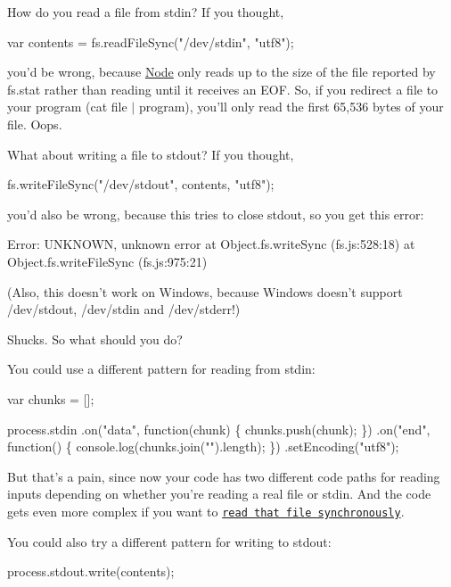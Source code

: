 How do you read a file from stdin? If you thought,


\begin{DoxyCode}
var contents = fs.readFileSync("/dev/stdin", "utf8");
\end{DoxyCode}


you’d be wrong, because \mbox{\hyperlink{classNode}{Node}} only reads up to the size of the file reported by fs.\+stat rather than reading until it receives an E\+OF. So, if you redirect a file to your program ({\ttfamily cat file $\vert$ program}), you’ll only read the first 65,536 bytes of your file. Oops.

What about writing a file to stdout? If you thought,


\begin{DoxyCode}
fs.writeFileSync("/dev/stdout", contents, "utf8");
\end{DoxyCode}


you’d also be wrong, because this tries to close stdout, so you get this error\+:


\begin{DoxyCode}
Error: UNKNOWN, unknown error
    at Object.fs.writeSync (fs.js:528:18)
    at Object.fs.writeFileSync (fs.js:975:21)
\end{DoxyCode}


(Also, this doesn’t work on Windows, because Windows doesn’t support /dev/stdout, /dev/stdin and /dev/stderr!)

Shucks. So what should you do?

You could use a different pattern for reading from stdin\+:


\begin{DoxyCode}
var chunks = [];

process.stdin
    .on("data", function(chunk) \{ chunks.push(chunk); \})
    .on("end", function() \{ console.log(chunks.join("").length); \})
    .setEncoding("utf8");
\end{DoxyCode}


But that’s a pain, since now your code has two different code paths for reading inputs depending on whether you’re reading a real file or stdin. And the code gets even more complex if you want to \href{https://github.com/mbostock/rw/blob/master/lib/rw/read-file-sync.js}{\tt read that file synchronously}.

You could also try a different pattern for writing to stdout\+:


\begin{DoxyCode}
process.stdout.write(contents);
\end{DoxyCode}


